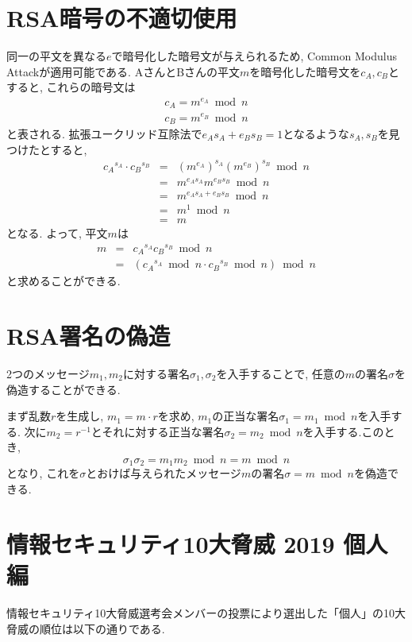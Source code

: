 \documentclass{jsarticle}
\begin{document}
\section{RSA暗号の不適切使用}
同一の平文を異なる$e$で暗号化した暗号文が与えられるため, Common Modulus Attackが適用可能である. AさんとBさんの平文$m$を暗号化した暗号文を$c_{A}, c_{B}$とすると, これらの暗号文は
\begin{eqnarray}
	c_A = m^{e_{A}} \bmod n \\
	c_B = m^{e_{B}} \bmod n
\end{eqnarray}
と表される. 拡張ユークリッド互除法で$e_{A}s_{A}+e_{B}s_{B}=1$となるような$s_{A}, s_{B}$を見つけたとすると, 
\begin{eqnarray}
	{c_{A}}^{s_{A}} \cdot {c_{B}}^{ s_{B}} & = & (m^{e_{A}})^{s_{A}}(m^{e_B})^{s_{B}} \bmod n \nonumber \\
	& = & m^{e_{A}s_{A}}m^{e_{B}s_{B}} \bmod n \nonumber \\
	& = & m^{e_{A}s_{A}+e_{B}s_{B}} \bmod n \nonumber \\
	& = & m^{1} \bmod n \nonumber \\
	& = & m
\end{eqnarray}
となる. よって, 平文$m$は
\begin{eqnarray}
	m & = & {c_{A}}^{s_{A}}{c_{B}}^{s_{B}} \bmod n \nonumber \\
	& = & ({c_{A}}^{s_{A}} \bmod n \cdot {c_{B}}^{s_{B}} \bmod n) \bmod n
\end{eqnarray}
と求めることができる.

\section{RSA署名の偽造}
2つのメッセージ$m_1, m_2$に対する署名$\sigma_1, \sigma_2$を入手することで, 任意の$m$の署名$\sigma$を偽造することができる.

まず乱数$r$を生成し, $m_1 = m \cdot r$を求め, $m_1$の正当な署名$\sigma_1 = m_1 \bmod n$を入手する. 次に$m_2 = r^{-1}$とそれに対する正当な署名$\sigma_2 = m_2 \bmod n$を入手する.このとき, 
\begin{equation}
\sigma_1\sigma_2 = m_1m_2 \bmod n = m \bmod n \nonumber
\end{equation}
となり, これを$\sigma$とおけば与えられたメッセージ$m$の署名$\sigma = m \bmod n$を偽造できる.

\section{情報セキュリティ10大脅威 2019 個人編}
情報セキュリティ10大脅威選考会メンバーの投票により選出した「個人」の10大脅威の順位は以下の通りである.
\end{document}
